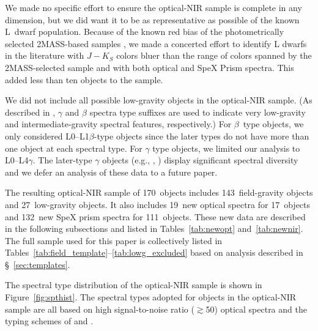 \documentclass[12pt]{aastex6}
\newcommand{\sample}{170}
\newcommand{\optField}{143}
\newcommand{\optLowG}{27}
\newcommand{\NewOptSpectra}{19} %
\newcommand{\NewOptObjects}{17} %
\newcommand{\NewPrismSpectra}{132} %
\newcommand{\NewPrismObjects}{111} %
\begin{document}
We made no specific effort to ensure the optical-NIR sample is complete in any dimension, but we did want it to be as representative as possible of the known L~dwarf population.
Because of the known red bias of the photometrically selected 2MASS-based samples \cite[Figure 3]{Schmidt10}, we made a concerted effort to identify L dwarfs in the literature with $J-K_S$ colors bluer than the range of colors spanned by the 2MASS-selected sample and with both optical and SpeX Prism spectra.
This added less than ten objects to the sample.

We did not include all possible low-gravity objects in the optical-NIR sample.
(As described in \cite{Cruz09_lowg}, $\gamma$ and $\beta$ spectra type suffixes are used to indicate very low-gravity and intermediate-gravity spectral features, respectively.)
For $\beta$~type objects, we only considered L0--L1$\beta$-type objects since the later types do not have more than one object at each spectral type.
For $\gamma$ type objects, we limited our analysis to L0--L4$\gamma$.
The later-type $\gamma$ objects (e.g., , \citealt{Cruz09_lowg}) display significant spectral diversity and we defer an analysis of these data to a future paper.

The resulting optical-NIR sample of \sample~objects includes \optField~field-gravity objects and \optLowG~low-gravity objects.
It also includes \NewOptSpectra~new optical spectra for \NewOptObjects~objects and \NewPrismSpectra~new SpeX prism spectra for \NewPrismObjects~objects.
These new data are described in the following subsections and listed in Tables~\ref{tab:newopt} and~\ref{tab:newnir}. The full sample used for this paper is collectively listed in Tables~\ref{tab:field_template}--\ref{tab:lowg_excluded} based on analysis described in \S~\ref{sec:templates}.

The spectral type distribution of the optical-NIR sample is shown in Figure~\ref{fig:spthist}.
The spectral types adopted for objects in the optical-NIR sample are all based on high signal-to-noise ratio ($\gtrsim$50) optical spectra and the typing schemes of \cite{K99} and \cite{Cruz09_lowg}.
\end{document}
